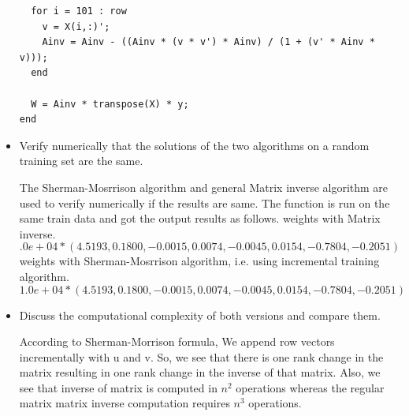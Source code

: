 \documentclass{article}
\begin{document}
\begin{itemize}
\begin{verbatim}
  for i = 101 : row
    v = X(i,:)';
    Ainv = Ainv - ((Ainv * (v * v') * Ainv) / (1 + (v' * Ainv * v)));
  end
  
  W = Ainv * transpose(X) * y;
end
\end{verbatim}

\item Verify numerically that the solutions of the two algorithms on a random training set are the same.
\begin{mdframed}[backgroundcolor=lightgray]
The Sherman-Mosrrison algorithm and general Matrix inverse algorithm are used to verify numerically if the results are same. The function is run on the same train data and got the output results as follows.
weights with Matrix inverse.
\[.0e+04 *
    (4.5193,
    0.1800,
   -0.0015,
    0.0074,
   -0.0045,
    0.0154,
   -0.7804,
   -0.2051)
 \] 
weights with Sherman-Mosrrison algorithm, i.e. using incremental training algorithm.
\[
1.0e+04 *
    (4.5193,
    0.1800,
   -0.0015,
    0.0074,
   -0.0045,
    0.0154,
   -0.7804,
   -0.2051)
\]
\end{mdframed}
   
\item Discuss the computational complexity of both versions and compare them.
\begin{mdframed}[backgroundcolor=lightgray]
According to Sherman-Morrison formula,
We append row vectors incrementally with u and v. So, we see that there is one rank change in the matrix resulting in one rank change in the inverse of that matrix.
Also, we see that inverse of matrix is computed in $n^2$ operations whereas the regular matrix matrix inverse computation requires $n^3$ operations.
\end{mdframed}
\end{itemize}
\end{document}
